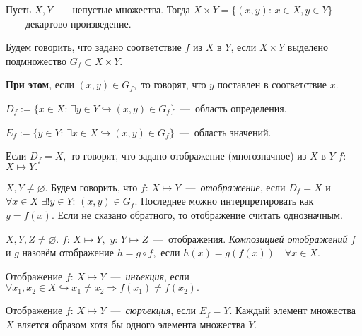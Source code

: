     \begin{definition}
	   Пусть $X, Y$~---~непустые множества. Тогда $X \times Y = \{ (x,y)$: $x \in X, y \in Y \}$~---~декартово произведение.
    \end{definition}

    \begin{definition}
	   Будем говорить, что задано соответствие $f$ из $X$ в $Y$, если $X \times Y$ выделено подмножество $G_{f} \subset X \times Y.$
    \end{definition}

    \textbf{При этом}, если $(x,y) \in G_{f},$ то говорят, что $y$ поставлен в соответствие $x.$

    $D_{f} := \{ x \in X$: $\exists y \in Y \hookrightarrow (x,y) \in G_{f} \}$~---~область определения.

    $E_{f} := \{ y \in Y$: $\exists x \in X \hookrightarrow (x,y) \in G_{f} \}$~---~область значений.

    \begin{definition}
        Если $D_{f} = X, $ то говорят, что задано отображение (многозначное) из $X$ в $Y$ $f$: $X \mapsto Y.$
    \end{definition}

    \begin{definition}
        $X, Y \neq \varnothing$. Будем говорить, что $f$: $X \mapsto Y$~---~\textit{отображение}, если $D_{f} = X$ и $\forall x \in X$ $\exists ! y \in Y$: $(x,y) \in G_{f}.$ Последнее можно интерпретировать как $y = f(x) .$ Если не сказано обратного, то отображение считать однозначным.
    \end{definition}

    \begin{definition}
        $X, Y, Z \neq \varnothing.$ $f$: $X \mapsto Y,$ $y$: $Y \mapsto Z$~---~отображения. \textit{Композицией отображений} $f$ и $g$ назовём отображение $h = g \circ f, $ если $h(x) = g(f(x)) \quad \forall x \in X.$
    \end{definition}

    \begin{definition}
        Отображение $f$: $X \mapsto Y$~---~\textit{инъекция}, если $\forall x_{1}, x_{2} \in X \hookrightarrow x_{1} \neq x_{2} \Rightarrow f(x_{1}) \neq f(x_{2}).$
    \end{definition}

    \begin{definition}
        Отображение $f$: $X \mapsto Y$~---~\textit{сюръекция}, если $E_{f} = Y.$  Каждый элемент множества $X$ вляется образом хотя бы одного элемента множества $Y.$
    \end{definition}

